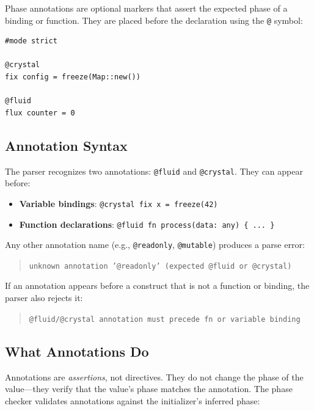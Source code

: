 
Phase annotations are optional markers that assert the expected phase of a binding or function.
They are placed before the declaration using the \lstinline|@| symbol:

\begin{lstlisting}[language=Lattice, caption={Phase annotations on variable bindings}]
#mode strict

@crystal
fix config = freeze(Map::new())

@fluid
flux counter = 0
\end{lstlisting}

\subsection{Annotation Syntax}

The parser recognizes two annotations: \lstinline|@fluid| and \lstinline|@crystal|.
They can appear before:

\begin{itemize}
  \item \textbf{Variable bindings}: \lstinline|@crystal fix x = freeze(42)|
  \item \textbf{Function declarations}: \lstinline|@fluid fn process(data: any) { ... }|
\end{itemize}

Any other annotation name (e.g., \lstinline|@readonly|, \lstinline|@mutable|) produces a parse error:
\begin{quote}\small
  \texttt{unknown annotation '@readonly' (expected @fluid or @crystal)}
\end{quote}

If an annotation appears before a construct that is not a function or binding, the parser also rejects it:
\begin{quote}\small
  \texttt{@fluid/@crystal annotation must precede fn or variable binding}
\end{quote}

\subsection{What Annotations Do}

Annotations are \emph{assertions}, not directives.
They do not change the phase of the value---they verify that the value's phase matches the annotation.
The phase checker validates annotations against the initializer's inferred phase:

